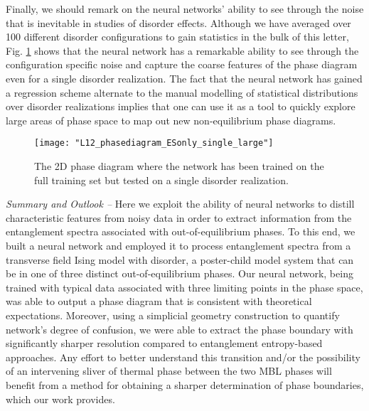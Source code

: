 \documentclass[amsmath,amssymb, aps, prb, superscriptaddress,twocolumn]{revtex4-1}
\begin{document}
Finally, we should remark on the neural networks' ability to see through the noise that is inevitable in studies of disorder effects. Although we have averaged over 100 different disorder configurations to gain statistics in the bulk of this letter,  Fig. \ref{fig:single} shows that the neural network has a remarkable ability to see through the configuration specific noise and capture the coarse features of the phase diagram even for a single disorder realization. The fact that the neural network has gained a regression scheme alternate to the manual modelling of statistical distributions over disorder realizations implies that one can use it as a tool to quickly explore large areas of phase space to map out new non-equilibrium phase diagrams. 

\begin{figure}[ht]
\centering
\texttt{[image: "L12\_phasediagram\_ESonly\_single\_large"]}
\caption{The 2D phase diagram where the network has been trained on the full training set but tested on a single disorder realization.}
\label{fig:single}
\end{figure}

{\it Summary and Outlook --}
Here we exploit the ability of neural networks to distill characteristic features from noisy data in order to extract information from the entanglement spectra associated with out-of-equilibrium phases. To this end, we built a neural network and employed it to process entanglement spectra from a transverse field Ising model with disorder, a poster-child model system that can be in one of three distinct out-of-equilibrium phases. Our neural network, being trained with typical data associated with three limiting points in the phase space, was able to output a phase diagram that is consistent with theoretical expectations. Moreover, using a simplicial geometry construction to quantify network's degree of confusion, we were able to extract the phase boundary with significantly sharper resolution compared to entanglement entropy-based approaches. Any effort to better understand this transition and/or the possibility of an intervening sliver of thermal phase between the two MBL phases will benefit from a method for obtaining a sharper determination of phase boundaries, which our work provides.
\end{document}
